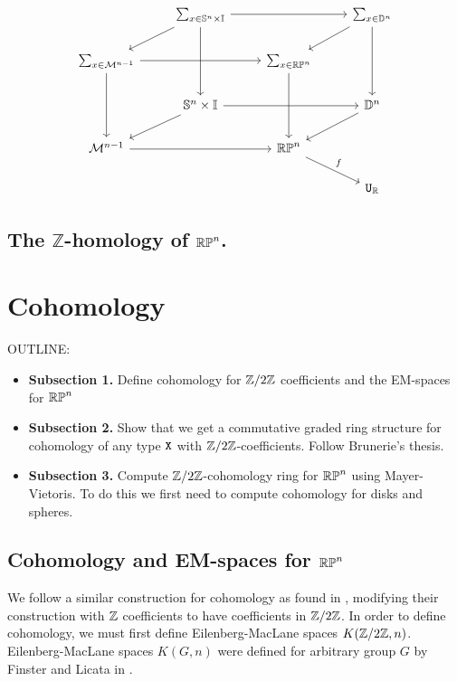 \documentclass{amsart}
\begin{document}
\[\begin{tikzcd}
										& \sum_{x \in \set{S}^n \times \set{I}} \arrow[rr]	\arrow[ld] \arrow[dd]	&							& \sum_{x \in \set{D}^n} \arrow[ld] \arrow[dd]\\
\sum_{x \in \mathcal{M}^{n-1}} \arrow[rr] \arrow[dd]	&													& \sum_{x \in \set{RP}^n} \arrow[dd]	&	\\
										& \set{S}^n \times \set{I} \arrow[rr] \arrow[ld]					&							& \set{D}^n \arrow [ld]\\
\mathcal{M}^{n-1} \arrow[rr]					&													& \set{RP}^n \arrow[rd, "f"]		& \\
										&													&							& \U_{\set{R}}
\end{tikzcd}
\]

\subsection{The $\mathbb{Z}$-homology of $\mathbb{RP}^n$.}

\section{Cohomology}
\label{sec:cohom}

OUTLINE:
\begin{itemize}
\item 
  \textbf{Subsection 1.} 
  Define cohomology for $ \mathbb{Z}/2\mathbb{Z} $ coefficients and the
  EM-spaces for $ \mathbb{RP}^n $ 
\item
  \textbf{Subsection 2.} Show that we get a commutative
  graded ring structure for cohomology of any type $ \mathtt{X} $
  with $ \mathbb{Z}/2\mathbb{Z} $-coefficients. Follow Brunerie's thesis.
\item
  \textbf{Subsection 3.} Compute $ \mathbb{Z}/2\mathbb{Z} $-cohomology ring
  for $ \mathbb{RP}^n $ using Mayer-Vietoris.  To do this we 
  first need to compute cohomology for disks and spheres.  
\end{itemize}


\subsection{Cohomology and EM-spaces for $\mathbb{RP}^n$}


We follow a similar construction for cohomology as found in \cite{brunerie:thesis}, modifying their construction with $\mathbb{Z}$ coefficients to have coefficients in $\mathbb{Z}/2\mathbb{Z}$. In order to define cohomology, we must first define Eilenberg-MacLane spaces $K(\mathbb{Z}/2\mathbb{Z},n)$. Eilenberg-MacLane spaces $K(G,n)$ were defined for arbitrary group $G$ by Finster and Licata in \cite{fl:em}.
\end{document}
